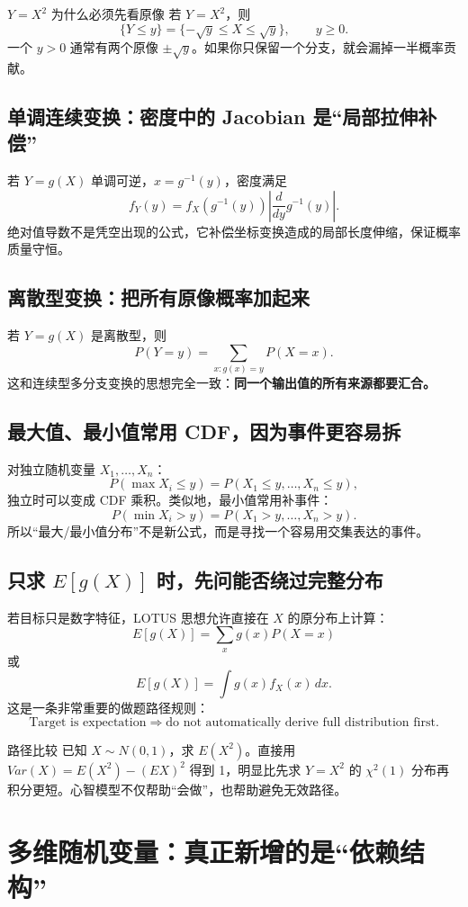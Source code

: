 \documentclass[11pt,a4paper,openany]{ctexbook}
\newcommand{\key}[1]{\textbf{\color{deep}#1}}
\begin{document}
\begin{examplebox}{$Y=X^2$ 为什么必须先看原像}
若 $Y=X^2$，则
\[
\{Y\le y\}=\{-\sqrt y\le X\le \sqrt y\},\qquad y\ge0.
\]
一个 $y>0$ 通常有两个原像 $\pm\sqrt y$。如果你只保留一个分支，就会漏掉一半概率贡献。
\end{examplebox}

\section{单调连续变换：密度中的 Jacobian 是“局部拉伸补偿”}
若 $Y=g(X)$ 单调可逆，$x=g^{-1}(y)$，密度满足
\[
f_Y(y)=f_X(g^{-1}(y))\left|\frac{d}{dy}g^{-1}(y)\right|.
\]
绝对值导数不是凭空出现的公式，它补偿坐标变换造成的局部长度伸缩，保证概率质量守恒。

\section{离散型变换：把所有原像概率加起来}
若 $Y=g(X)$ 是离散型，则
\[
P(Y=y)=\sum_{x:g(x)=y}P(X=x).
\]
这和连续型多分支变换的思想完全一致：\key{同一个输出值的所有来源都要汇合。}

\section{最大值、最小值常用 CDF，因为事件更容易拆}
对独立随机变量 $X_1,\dots,X_n$：
\[
P(\max X_i\le y)=P(X_1\le y,\dots,X_n\le y),
\]
独立时可以变成 CDF 乘积。类似地，最小值常用补事件：
\[
P(\min X_i>y)=P(X_1>y,\dots,X_n>y).
\]
所以“最大/最小值分布”不是新公式，而是寻找一个容易用交集表达的事件。

\section{只求 $E[g(X)]$ 时，先问能否绕过完整分布}
若目标只是数字特征，LOTUS 思想允许直接在 $X$ 的原分布上计算：
\[
E[g(X)]=\sum_xg(x)P(X=x)
\]
或
\[
E[g(X)]=\int g(x)f_X(x)\,dx.
\]
这是一条非常重要的做题路径规则：
\[
\boxed{\text{Target is expectation}\Rightarrow\text{do not automatically derive full distribution first}.}
\]

\begin{examBox}{路径比较}
已知 $X\sim N(0,1)$，求 $E(X^2)$。直接用 $Var(X)=E(X^2)-(EX)^2$ 得到 1，明显比先求 $Y=X^2$ 的 $\chi^2(1)$ 分布再积分更短。心智模型不仅帮助“会做”，也帮助避免无效路径。
\end{examBox}

\chapter{多维随机变量：真正新增的是“依赖结构”}
\end{document}
